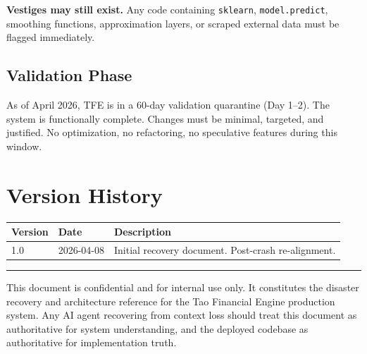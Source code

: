 \documentclass[11pt, a4paper]{article}
\begin{document}
\textbf{Vestiges may still exist.} Any code containing \texttt{sklearn}, \texttt{model.predict},
smoothing functions, approximation layers, or scraped external data must be flagged immediately.

\subsection{Validation Phase}

As of April 2026, TFE is in a 60-day validation quarantine (Day 1--2). The system
is functionally complete. Changes must be minimal, targeted, and justified. No
optimization, no refactoring, no speculative features during this window.

\section{Version History}

\begin{center}
\begin{tabular}{@{}lll@{}}
\toprule
\textbf{Version} & \textbf{Date} & \textbf{Description} \\
\midrule
1.0 & 2026-04-08 & Initial recovery document. Post-crash re-alignment. \\
\bottomrule
\end{tabular}
\end{center}

\vspace{2em}
\hrule
\vspace{0.5em}
{\color{tfe-gray}\small This document is confidential and for internal use only.
It constitutes the disaster recovery and architecture reference for the
Tao Financial Engine production system. Any AI agent recovering from context
loss should treat this document as authoritative for system understanding,
and the deployed codebase as authoritative for implementation truth.}
\end{document}
